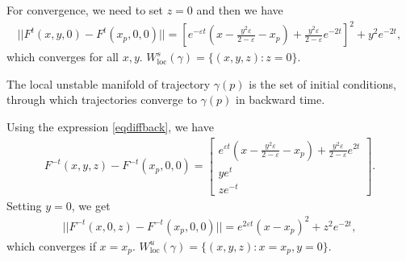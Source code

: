 \begin{solution}[9.5]
\begin{enumerate}
For convergence, we need to set $z=0$ and then we have
\begin{align}
||F^t(x,y,0) - F^t(x_p, 0, 0)|| =\left[ e^{-\varepsilon t} \left(x - \frac{y^2 \varepsilon }{2-\varepsilon} - x_p \right) + \frac{y^2 \varepsilon }{2-\varepsilon}e^{-2t} \right]^2 + y^2e^{-2t},
\end{align}
which converges for all $x,y$. $W^s_\text{loc}(\gamma) = \{ (x,y,z): z=0\}$. 


The local unstable manifold of trajectory $\gamma(p)$ is the set of initial conditions, through which trajectories converge to $\gamma(p)$ in backward time.

Using the expression \eqref{eqdiffback}, we have
\begin{align}
F^{-t}(x,y,z) - F^{-t}(x_p, 0, 0) = \begin{bmatrix}
e^{\varepsilon t} \left(x - \frac{y^2 \varepsilon }{2-\varepsilon} - x_p \right) + \frac{y^2 \varepsilon }{2-\varepsilon}e^{2t}\\
y e^{t} \\
z e^{-t}
\end{bmatrix}.
\end{align}
Setting $y=0$, we get
\begin{align}
||F^{-t}(x,0,z) - F^{-t}(x_p, 0, 0)|| = e^{2\varepsilon t} \left(x - x_p \right)^2 + z^2e^{-2t},
\end{align}
which converges if $x=x_p$. $W^u_\text{loc}(\gamma) = \{ (x,y,z): x=x_p, y=0\}$. 
	\end{enumerate}
	

\end{solution}
